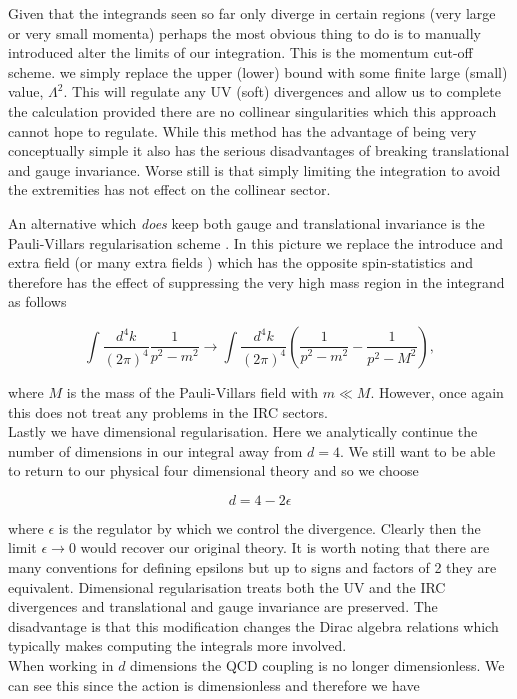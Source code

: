 		Given that the integrands seen so far only diverge in certain regions (very large or very small momenta)
		perhaps the most obvious thing to do is to manually introduced alter the limits of our integration. This
		is the momentum cut-off scheme. we simply replace the upper (lower) bound with some finite large (small)
		value, $\Lambda^2$.  This will regulate any UV (soft) divergences and allow us to complete the calculation
		provided there are no collinear singularities which this approach cannot hope to regulate.  While this
		method has the advantage of being very conceptually simple it also has the serious disadvantages of
		breaking translational and gauge invariance.  Worse still is that simply limiting the integration to
		avoid the extremities has not effect on the collinear sector.

		An alternative which \emph{does} keep both gauge and translational invariance is the Pauli-Villars
		regularisation scheme \cite{RevModPhys.21.434}.  In this picture we replace the introduce and extra field (or many extra fields
		\cite{FROLOV1993344}) which has the opposite spin-statistics and therefore has the effect of suppressing
		the very high mass region in the integrand as follows

		\begin{equation}
			\int\frac{d^4k}{(2\pi)^4}\frac{1}{p^2-m^2}\rightarrow\int\frac{d^4k}{(2\pi)^4}\left(\frac{1}{p^2-m^2} - \frac{1}{p^2-M^2}\right),
		\end{equation}

		where $M$ is the mass of the Pauli-Villars field with $m\ll M$.  However, once again this does not treat any
		problems in the IRC sectors.  \\Lastly we have dimensional regularisation.  Here we analytically continue the
		number of dimensions in our integral away from $d=4$.  We still want to be able to return to our physical four
		dimensional theory and so we choose

		\begin{equation}
			d=4-2\epsilon
		\end{equation}

		where $\epsilon$ is the regulator by which we control the divergence. Clearly then the limit
		$\epsilon\rightarrow 0$ would recover our original theory.  It is worth noting that there are many
		conventions for defining epsilons but up to signs and factors of 2 they are equivalent. Dimensional
		regularisation treats both the UV and the IRC divergences and translational and gauge invariance are
		preserved.  The disadvantage is that this modification changes the Dirac algebra relations which
		typically makes computing the integrals more involved.\\When working in $d$ dimensions the QCD coupling
		is no longer dimensionless.  We can see this since the action is dimensionless and therefore we have

